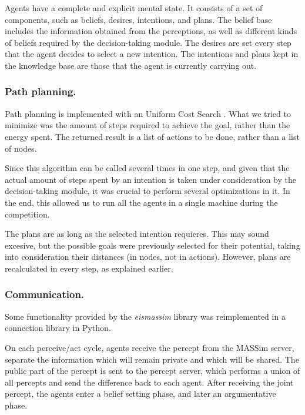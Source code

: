 \documentclass{llncs2e/llncs}
\begin{document}
    Agents have a complete and explicit mental state. It consists of a set of 
    components, such as beliefs, desires, intentions, and plans. 
    The belief base includes the information obtained from the perceptions, as
    well as different kinds of beliefs required by the decision-taking module.
    The desires are set every step that the agent decides to select a new intention.
    The intentions and plans kept in the knowledge base are those that the agent
    is currently carrying out.
    
\subsubsection{Path planning.}

    Path planning is implemented with an Uniform Cost Search 
    \cite{Russell:2003:AIM:773294}. 
    What we tried to minimize was the amount of steps required to achieve the 
    goal, rather than the energy spent. 
    The returned result is a list of actions to be done, rather than a list of 
    nodes.
    
    Since this algorithm can be called several times in one step, and given that the 
    actual amount of steps spent by an intention is taken under consideration by 
    the decision-taking module, it was crucial to perform several optimizations in 
    it. In the end, this allowed us to run all the agents in a single machine  
    during the competition.
    
    The plans are as long as the selected intention requieres. This may 
    sound excesive, but the possible goals were previously selected for their 
    potential, taking into consideration their distances (in nodes, not in 
    actions). However, plans are recalculated in every step, as explained earlier.    

\subsubsection{Communication.}

    Some functionality provided by the \textit{eismassim} library was
    reimplemented in a connection library in Python.

    On each perceive/act cycle, agents receive the percept from the MASSim server, 
    separate the information which will remain private and which will be shared. 
    The public part of the percept is sent to the percept server, which performs a 
    union of all percepts and send the difference back to each agent. After 
    receiving the joint percept, the agents enter a belief setting phase, and 
    later an argumentative phase.
\end{document}
